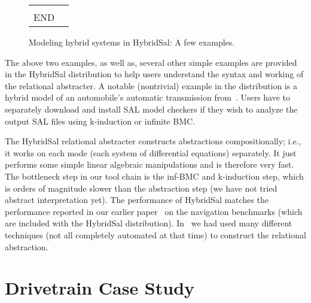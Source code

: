 \documentclass{llncs}
\begin{document}
\begin{figure}[htb!]
\begin{tt}
\begin{tabular}{ll}
\begin{minipage}{2in}
\begin{tabbing}
%
%
\\
END
\end{tabbing}
\end{minipage}
\end{tabular}
\end{tt}
\caption{Modeling hybrid systems in HybridSal: A few examples.}
\label{fig:ex}
\end{figure}

The above two examples, as well as,
several other simple examples are provided in the
HybridSal distribution to help
users understand the syntax and working of the
relational abstracter.  
A notable (nontrivial) example in the distribution is a hybrid
model of an automobile's automatic transmission from~\cite{ChutinanButts02:Mobies}.
Users have to separately
download and install SAL model checkers if they
wish to analyze the output SAL files using
k-induction or infinite BMC.

The HybridSal relational abstracter constructs abstractions
compositionally; i.e., it works on each mode 
(each system of differential equations) separately.
It just performs some simple linear algebraic manipulations
and is therefore very fast.  
The bottleneck step in our tool chain
is the inf-BMC and k-induction step,
which is orders of magnitude slower than the abstraction step
(we have not tried abstract interpretation yet).
The performance of HybridSal matches the performance reported 
in our earlier paper~\cite{ST11:CAVsmall} on the navigation
benchmarks (which are included with the HybridSal distribution).
In~\cite{ST11:CAVsmall} we had used many
different techniques (not all completely automated at that time)
to construct the relational abstraction.



\section{Drivetrain Case Study}
\end{document}

